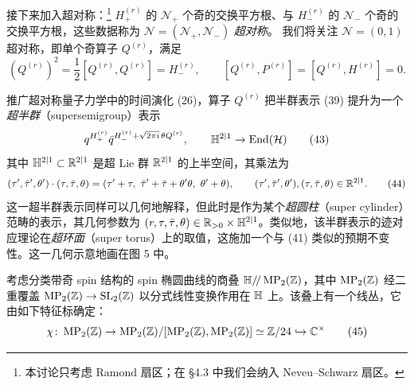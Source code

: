接下来加入超对称：\footnote{本讨论只考虑 Ramond 扇区；在 §4.3 中我们会纳入 Neveu--Schwarz 扇区。} $H^{(r)}_+$ 的 $\mathcal N_+$ 个奇的交换平方根、与 $H^{(r)}_-$ 的 $\mathcal N_-$ 个奇的交换平方根，这些数据称为 $\mathcal N=(\mathcal N_+,\mathcal N_-)$ \emph{超对称}。 我们将关注 $\mathcal N=(0,1)$ 超对称，即单个奇算子 $Q^{(r)}$，满足
\begin{equation}
(Q^{(r)})^2=\frac12[Q^{(r)},Q^{(r)}]=H^{(r)}_-,\qquad [Q^{(r)},P^{(r)}]=[Q^{(r)},H^{(r)}]=0.
\tag{42}
\end{equation}

推广超对称量子力学中的时间演化 (26)，算子 $Q^{(r)}$ 把半群表示 (39) 提升为一个\emph{超半群}（supersemigroup）表示
\begin{equation}
q^{H^{(r)}_+}\bar q^{H^{(r)}_-+\sqrt{2\pi i}\,\theta Q^{(r)}},\qquad \mathbb H^{2|1}\to\mathrm{End}(\mathcal{H})
\tag{43}
\end{equation}
其中 $\mathbb{H}^{2|1}\subset\mathbb{R}^{2|1}$ 是超 Lie 群 $\mathbb{R}^{2|1}$ 的上半空间，其乘法为
\begin{equation}
(\tau',\bar\tau',\theta')\cdot(\tau,\bar\tau,\theta)=(\tau'+\tau,\ \bar\tau'+\bar\tau+\theta'\theta,\ \theta'+\theta),\qquad (\tau',\bar\tau',\theta'),(\tau,\bar\tau,\theta)\in\R^{2|1}.
\tag{44}
\end{equation}
这一超半群表示同样可以几何地解释，但此时是作为某个\emph{超圆柱}（super cylinder）范畴的表示，其几何参数为 $(r,\tau,\bar\tau,\theta)\in\mathbb{R}_{>0}\times\mathbb{H}^{2|1}$。类似地，该半群表示的迹对应理论在\emph{超环面}（super torus）上的取值，这施加一个与 (41) 类似的预期不变性。这一几何示意地画在图 5 中。



\begin{remark}[4.1]
考虑分类带奇 spin 结构的 spin 椭圆曲线的商叠 $\mathbb{H}/\!/\operatorname{MP}_2(\mathbb{Z})$，其中 $\operatorname{MP}_2(\mathbb{Z})$ 经二重覆盖 $\operatorname{MP}_2(\mathbb{Z})\to\mathrm{SL}_2(\mathbb{Z})$ 以分式线性变换作用在 $\mathbb{H}$ 上。该叠上有一个线丛，它由如下特征标确定：
\begin{equation}
\chi\colon\operatorname{MP}_2(\mathbb{Z})\to\operatorname{MP}_2(\mathbb{Z})/[\operatorname{MP}_2(\mathbb{Z}),\operatorname{MP}_2(\mathbb{Z})]\simeq\mathbb{Z}/24\hookrightarrow\mathbb{C}^\times
\tag{45}
\end{equation}
\end{remark}

